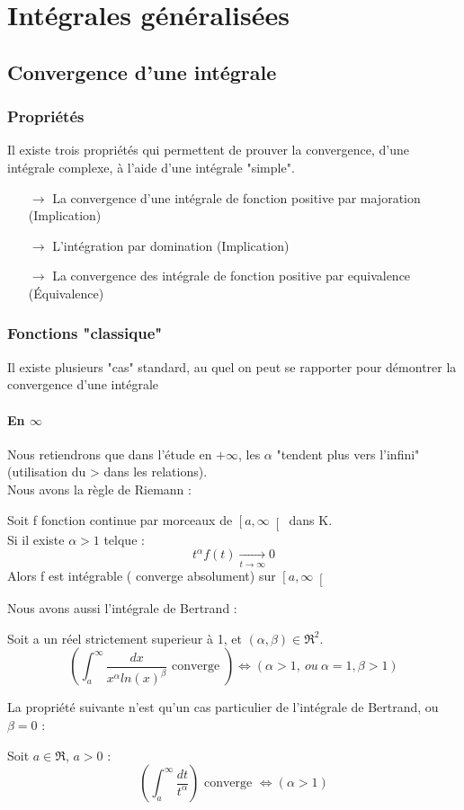 \chapter{Intégrales généralisées}
\section{Convergence d'une intégrale}
\subsection{Propriétés}
Il existe trois propriétés qui permettent de prouver la convergence, d'une intégrale complexe, à l'aide d'une intégrale "simple".
\begin{itemize}
 \item[$\rightarrow$] La convergence d'une intégrale de fonction positive par majoration (Implication)
 \item[$\rightarrow$] L'intégration par domination (Implication)
 \item[$\rightarrow$] La convergence des intégrale de fonction positive par equivalence (Équivalence)
\end{itemize}
\subsection{Fonctions "classique"}
Il existe plusieurs "cas" standard, au quel on peut se rapporter pour démontrer la convergence d'une intégrale
\subsubsection{En $\infty$}
Nous retiendrons que dans l'étude en $+\infty$, les $\alpha$ "tendent plus vers l'infini" (utilisation du > dans les relations). \\
Nous avons la règle de Riemann :
\begin{prop}
Soit f fonction continue par morceaux de $\left[a,\infty\right[$ dans K.\\
Si il existe $\alpha > 1$ telque : 
$$t^{\alpha}f(t) \underset{t \rightarrow \infty}\rightarrow 0$$
Alors f est intégrable ( converge absolument) sur $\left[a,\infty\right[$
\end{prop}
Nous avons aussi l'intégrale de Bertrand : 
\begin{prop}
Soit a un réel strictement superieur à 1, et $(\alpha,\beta) \in \Re^2$.
$$\left(\int_a^{\infty} \dfrac{dx}{x^{\alpha}ln(x)^{\beta}} \mbox{ converge }\right) \Leftrightarrow ( \alpha > 1,~ ou~ \alpha=1,\beta>1)$$
\end{prop}
La propriété suivante n'est qu'un cas particulier de l'intégrale de Bertrand, ou $\beta = 0$ :
\begin{prop}
Soit $a \in \Re$, $a>0$ :
$$\left(\int_a^{\infty} \dfrac{dt}{t^{\alpha}}\right) \mbox{ converge } \Leftrightarrow (\alpha > 1)$$
\end{prop}
